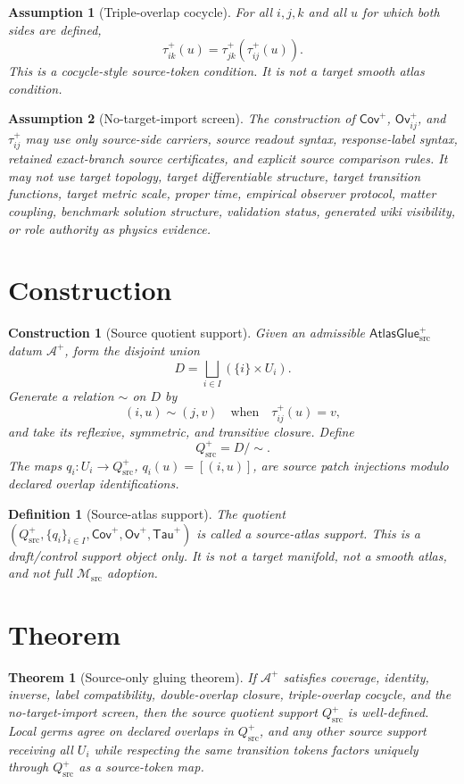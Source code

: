 \documentclass[11pt]{article}
\newcommand{\Msrc}{\mathcal{M}_{\mathrm{src}}}
\newcommand{\AtlasGlue}{\mathsf{AtlasGlue}_{\mathrm{src}}^{+}}
\newcommand{\Cov}{\mathsf{Cov}^{+}}
\newcommand{\Ov}{\mathsf{Ov}^{+}}
\newcommand{\Tau}{\mathsf{Tau}^{+}}
\newcommand{\Qsrc}{Q_{\mathrm{src}}^{+}}
\newcommand{\Disj}{\bigsqcup}
\newtheorem{definition}{Definition}
\newtheorem{assumption}{Assumption}
\newtheorem{construction}{Construction}
\newtheorem{theorem}{Theorem}
\begin{document}
\begin{assumption}[Triple-overlap cocycle]
For all \(i,j,k\) and all \(u\) for which both sides are defined,
\[
  \tau_{ik}^+(u)=\tau_{jk}^+(\tau_{ij}^+(u)).
\]
This is a cocycle-style source-token condition. It is not a target smooth
atlas condition.
\end{assumption}

\begin{assumption}[No-target-import screen]
The construction of \(\Cov\), \(\Ov_{ij}\), and \(\tau_{ij}^+\) may use only
source-side carriers, source readout syntax, response-label syntax, retained
exact-branch source certificates, and explicit source comparison rules. It may
not use target topology, target differentiable structure, target transition
functions, target metric scale, proper time, empirical observer protocol,
matter coupling, benchmark solution structure, validation status, generated
wiki visibility, or role authority as physics evidence.
\end{assumption}

\section{Construction}

\begin{construction}[Source quotient support]
Given an admissible \(\AtlasGlue\) datum \(\mathcal A^+\), form the disjoint
union
\[
  D=\Disj_{i\in I}(\{i\}\times U_i).
\]
Generate a relation \(\sim\) on \(D\) by
\[
  (i,u)\sim(j,v)\quad\text{when}\quad \tau_{ij}^+(u)=v,
\]
and take its reflexive, symmetric, and transitive closure. Define
\[
  \Qsrc = D/{\sim}.
\]
The maps \(q_i:U_i\to\Qsrc\), \(q_i(u)=[(i,u)]\), are source patch injections
modulo declared overlap identifications.
\end{construction}

\begin{definition}[Source-atlas support]
The quotient \((\Qsrc,\{q_i\}_{i\in I},\Cov,\Ov,\Tau)\) is called a
source-atlas support. This is a draft/control support object only. It is not
a target manifold, not a smooth atlas, and not full \(\Msrc\) adoption.
\end{definition}

\section{Theorem}

\begin{theorem}[Source-only gluing theorem]
If \(\mathcal A^+\) satisfies coverage, identity, inverse, label
compatibility, double-overlap closure, triple-overlap cocycle, and the
no-target-import screen, then the source quotient support \(\Qsrc\) is
well-defined. Local germs agree on declared overlaps in \(\Qsrc\), and any
other source support receiving all \(U_i\) while respecting the same transition
tokens factors uniquely through \(\Qsrc\) as a source-token map.
\end{theorem}
\end{document}
